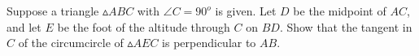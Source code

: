 Suppose a triangle $\vartriangle ABC$ with $\angle C = 90^o$ is given. Let $D$ be the midpoint of $AC$,  and let $E$ be the foot of the altitude through $C$ on $BD$. Show that the tangent in $C$ of the circumcircle of $\vartriangle AEC$ is perpendicular to $AB$.